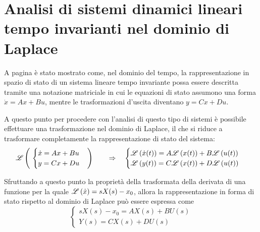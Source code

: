 \chapter{Analisi di sistemi dinamici lineari tempo invarianti nel dominio di Laplace}
	A pagina \pageref{eq:rapp-matriciale} è stato mostrato come, nel dominio del tempo, la rappresentazione in spazio di stato di un sistema lineare tempo invariante possa essere descritta tramite una notazione matriciale in cui le equazioni di stato assumono una forma $\dot x = Ax+Bu$, mentre le trasformazioni d'uscita diventano $y = Cx+ Du$.
	
	A questo punto per procedere con l'analisi di questo tipo di sistemi è possibile effettuare una trasformazione nel dominio di Laplace, il che si riduce a trasformare completamente la rappresentazione di stato del sistema:
	\[\mathscr L \left( \ \begin{cases}
		\dot x = Ax + Bu \\ y = Cx+Du
		\end{cases} \right) \qquad \Rightarrow\quad \begin{cases}
		\mathscr L \left( \dot x(t) \right) = A\mathscr L \left( x(t) \right) + B\mathscr L \left( u(t) \right) \\
		\mathscr L \left( y(t) \right) = C\mathscr L \left( x(t) \right) + D\mathscr L \left( u(t) \right) 
	\end{cases}\]
	
	Sfruttando a questo punto la proprietà della trasformata della derivata di una funzione per la quale $\mathscr L \left( \dot x \right) = sX(s) - x_0$, allora la rappresentazione in forma di stato rispetto al dominio di Laplace può essere espressa come
	\begin{equation} \label{eq:lti:statolaplace}
		\begin{cases}
			sX(s) - x_0 = AX(s) + BU(s) \\ Y(s) = CX(s) + DU(s)
		\end{cases}
	\end{equation}
	
